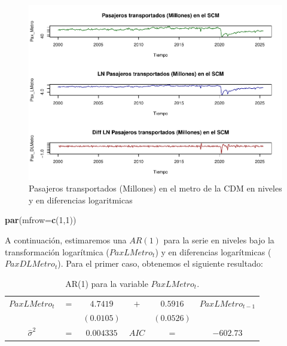 \documentclass[
]{book}
\newenvironment{Shaded}{\begin{snugshade}}{\end{snugshade}}
\newcommand{\AttributeTok}[1]{\textcolor[rgb]{0.13,0.29,0.53}{#1}}
\newcommand{\DecValTok}[1]{\textcolor[rgb]{0.00,0.00,0.81}{#1}}
\newcommand{\FunctionTok}[1]{\textcolor[rgb]{0.13,0.29,0.53}{\textbf{#1}}}
\newcommand{\NormalTok}[1]{#1}
\begin{document}
\begin{figure}

{\centering \includegraphics{Notas-Series-Tiempo_files/figure-latex/fig46-1} 

}

\caption{Pasajeros transportados (Millones) en el metro de la CDM en niveles y en diferencias logaritmicas}\label{fig:fig46}
\end{figure}

\begin{Shaded}
\begin{Highlighting}[]
\FunctionTok{par}\NormalTok{(}\AttributeTok{mfrow=}\FunctionTok{c}\NormalTok{(}\DecValTok{1}\NormalTok{,}\DecValTok{1}\NormalTok{))}
\end{Highlighting}
\end{Shaded}

A continuación, estimaremos una \(AR(1)\) para la serie en niveles bajo la transformación logarítmica (\(PaxLMetro_t\)) y en diferencias logarítmicas (\(PaxDLMetro_t\)). Para el primer caso, obtenemos el siguiente resultado:

\begin{longtable}[]{@{}cccccc@{}}
\caption{\label{tab:AR01} AR(1) para la variable \(PaxLMetro_t\).}\tabularnewline
\toprule\noalign{}
\endfirsthead
\endhead
\bottomrule\noalign{}
\endlastfoot
\(PaxLMetro_t\) & \(=\) & \(4.7419\) & \(+\) & \(0.5916\) & \(PaxLMetro_{t-1}\) \\
& & \((0.0105)\) & & \((0.0526)\) & \\
\(\hat{\sigma}^2\) & \(=\) & \(0.004335\) & \(AIC\) & \(=\) & \(-602.73\) \\
\end{longtable}
\end{document}
